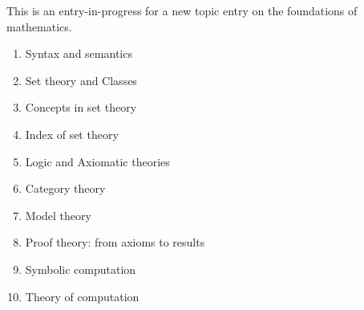 \documentclass[12pt]{article}
\begin{document}
This is an entry-in-progress for a new topic entry on the foundations of mathematics.

\begin{enumerate}
\item Syntax and semantics
\item Set theory and Classes
\item Concepts in set theory
\item Index of set theory
\item Logic and Axiomatic theories
\item Category theory 
\item Model theory
\item Proof theory: from axioms to results
\item Symbolic computation
\item Theory of computation
\end{enumerate}
\end{document}
